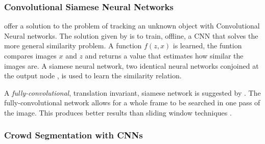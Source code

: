   \subsubsection{Convolutional Siamese Neural Networks}
  \citeauthor{bertinetto2016} \cite{bertinetto2016} offer a solution to the problem of tracking an unknown object with Convolutional Neural networks.
  The solution given by \citeauthor{bertinetto2016} is to train, offline, a CNN that solves the more general similarity problem.
  A function $f(z,x)$ is learned, the funtion compares images $x$ and $z$ and returns a value that estimates how similar the images are.
  A siamese neural network, two identical neural networks conjoined at the output node \cite{bromley1993}, is used to learn the similarity relation.

  A \textit{fully-convolutional}, translation invariant, siamese network is suggested by \citeauthor{bertinetto2016}.
  The fully-convolutional network allows for a whole frame to be searched in one pass of the image.
  This produces better results than sliding window techniques \cite{kang2014}.

  \subsubsection{Crowd Segmentation with CNNs}
  

